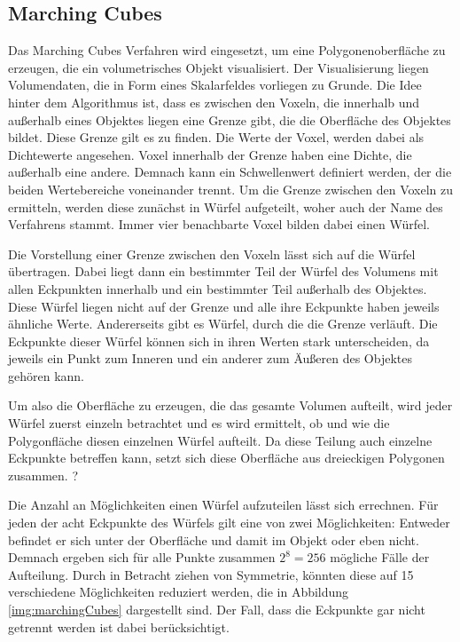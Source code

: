 

\subsection{Marching Cubes}
\label{marchingCubes}

Das Marching Cubes Verfahren wird eingesetzt, um eine Polygonenoberfläche zu erzeugen, die ein volumetrisches Objekt visualisiert. 
Der Visualisierung liegen Volumendaten, die in Form eines Skalarfeldes vorliegen zu Grunde.
Die Idee hinter dem Algorithmus ist, dass es zwischen den Voxeln, die innerhalb und außerhalb eines Objektes liegen eine Grenze gibt, die die Oberfläche des Objektes bildet. Diese Grenze gilt es zu finden. 
Die Werte der Voxel, werden dabei als Dichtewerte angesehen. Voxel innerhalb der Grenze haben eine Dichte, die außerhalb eine andere. Demnach kann ein Schwellenwert definiert werden, der die beiden Wertebereiche voneinander trennt.
Um die Grenze zwischen den Voxeln zu ermitteln, werden diese zunächst in Würfel aufgeteilt, woher auch der Name des Verfahrens stammt. Immer vier benachbarte Voxel bilden dabei einen Würfel.  

Die Vorstellung einer Grenze zwischen den Voxeln lässt sich auf die Würfel übertragen. Dabei liegt dann ein bestimmter Teil der Würfel des Volumens mit allen Eckpunkten innerhalb und ein bestimmter Teil außerhalb des Objektes. Diese Würfel liegen nicht auf der Grenze und alle ihre Eckpunkte haben jeweils ähnliche Werte. Andererseits gibt es Würfel, durch die die Grenze verläuft. Die Eckpunkte dieser Würfel können sich in ihren Werten stark unterscheiden, da jeweils ein Punkt zum Inneren und ein anderer zum Äußeren des Objektes gehören kann. 

Um also die Oberfläche zu erzeugen, die das gesamte Volumen aufteilt, wird jeder Würfel zuerst einzeln betrachtet und es wird ermittelt, ob und wie die Polygonfläche diesen einzelnen Würfel aufteilt.  Da diese Teilung auch einzelne Eckpunkte betreffen kann, setzt sich diese Oberfläche aus dreieckigen Polygonen zusammen. ?

Die Anzahl an Möglichkeiten einen Würfel aufzuteilen lässt sich errechnen. Für jeden der acht Eckpunkte des Würfels gilt eine von zwei Möglichkeiten: Entweder befindet er sich unter der Oberfläche und damit im Objekt oder eben nicht. Demnach ergeben sich für alle Punkte zusammen $2^8=256$ mögliche Fälle der Aufteilung. Durch in Betracht ziehen von Symmetrie, könnten diese auf 15 verschiedene Möglichkeiten reduziert werden, die in Abbildung \ref{img:marchingCubes} dargestellt sind. Der Fall, dass die Eckpunkte gar nicht getrennt werden ist dabei berücksichtigt. 

